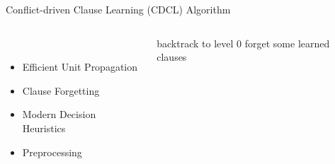 \documentclass[t]{sdqbeamer}
\begin{document}
\begin{frame}{Conflict-driven Clause Learning (CDCL) Algorithm}
\vspace*{-1em}
\begin{columns}[T]
\begin{column}{.3\linewidth}
~\\[1em]
\begin{itemize}%
    \item Efficient Unit Propagation
    \item Clause Forgetting
    \item Modern Decision Heuristics
\end{itemize}
\begin{itemize}
    \item Preprocessing
\end{itemize}
\end{column}
\begin{column}{.6\linewidth}
\begin{algorithm}[H]
    \DontPrintSemicolon
    \caption{CDCL(CNF Formula $F$, \&Assignment A $\leftarrow \emptyset$)}
    

    
     {
        \Return \UNSAT
    }
     {
        \propagation\;
         {
             {
                \Return \UNSAT
            }
        }
        \lIf {\restart} {
            backtrack to level $0$
        }
        \lIf {\cleanup} {
            forget some learned clauses
        }
        \branching\;
    }
    \Return \SAT\;
\end{algorithm}
\end{column}
\end{columns}
\end{frame}
\end{document}

